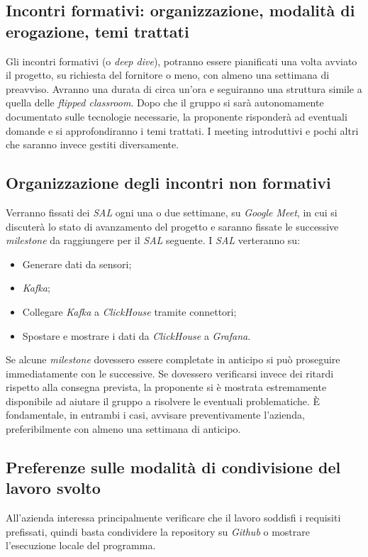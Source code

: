 \documentclass[8pt]{article}
\begin{document}
\subsection{Incontri formativi: organizzazione, modalità di erogazione, temi trattati}
Gli incontri formativi (o \textit{deep dive}), potranno essere pianificati una volta avviato il progetto, su richiesta del fornitore o meno, con almeno una settimana di preavviso. Avranno una durata di circa un'ora e seguiranno una struttura simile a quella delle \textit{flipped classroom}. Dopo che il gruppo si sarà autonomamente documentato sulle tecnologie necessarie, la proponente risponderà ad eventuali domande e si approfondiranno i temi trattati. I meeting introduttivi e pochi altri che saranno invece gestiti diversamente.

\subsection{Organizzazione degli incontri non formativi}
Verranno fissati dei \textit{SAL} ogni una o due settimane, su \textit{Google Meet}, in cui si discuterà lo stato di avanzamento del progetto e saranno fissate le successive \textit{milestone} da raggiungere per il \textit{SAL} seguente. I \textit{SAL} verteranno su:
\begin{itemize}
	\setlength\itemsep{0em}
	\item Generare dati da sensori;
	\item \textit{Kafka};
	\item Collegare \textit{Kafka} a \textit{ClickHouse} tramite connettori;
	\item Spostare e mostrare i dati da \textit{ClickHouse} a \textit{Grafana}.
\end{itemize}
Se alcune \textit{milestone} dovessero essere completate in anticipo si può proseguire immediatamente con le successive. Se dovessero verificarsi invece dei ritardi rispetto alla consegna prevista, la proponente si è mostrata estremamente disponibile ad aiutare il gruppo a risolvere le eventuali problematiche. È fondamentale, in entrambi i casi, avvisare preventivamente l'azienda, preferibilmente con almeno una settimana di anticipo.

\subsection{Preferenze sulle modalità di condivisione del lavoro svolto}
All'azienda interessa principalmente verificare che il lavoro soddisfi i requisiti prefissati, quindi basta condividere la repository su \textit{Github} o mostrare l'esecuzione locale del programma.
\end{document}
